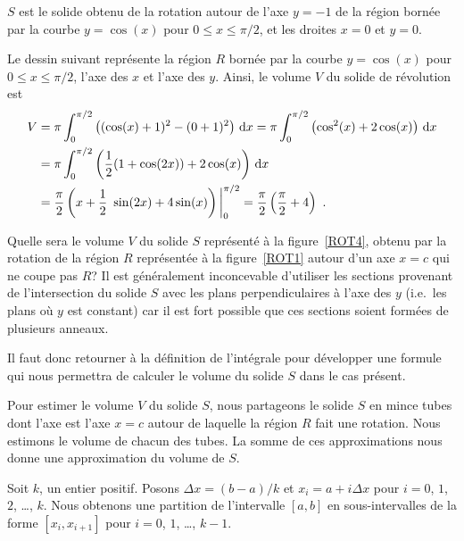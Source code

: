 {\begin{egg}
 $S$ est le solide obtenu de la rotation autour de l'axe $y=-1$ de la
région bornée par la courbe $y=\cos(x)$ pour $0\leq x\leq \pi/2$, et les
droites $x=0$ et $y=0$.

Le dessin suivant représente la région $R$ bornée par la courbe
$y=\cos(x)$ pour $0\leq x \leq \pi/2$, l'axe des $x$ et l'axe des $y$.
Ainsi, le volume $V$ du solide de révolution est
\begin{align*}
V &= \pi \int_0^{\pi/2} \left( (\cos(x) + 1)^2 - (0 +1)^2 \right) \,\mathrm{d}x
= \pi \int_0^{\pi/2} \left( \cos^2(x) + 2\cos(x) \right) \,\mathrm{d}x \\
& = \pi \int_0^{\pi/2} \left( \frac{1}{2} (1+\cos(2x)) + 2\cos(x)\right)
\,\mathrm{d}x \\
&= \frac{\pi}{2} \left( x + \frac{1}{2}\ \sin(2x) + 4\sin(x)
\right)\bigg|_0^{\pi/2} 
= \frac{\pi}{2}\left(\frac{\pi}{2} + 4\right) \ .
\end{align*}
\label{eggSR_washer}
\end{egg}

Quelle sera le volume $V$ du solide $S$ représenté à la
figure~\ref{ROT4}, obtenu par la rotation de la région $R$ représentée à
la figure~\ref{ROT1} autour d'un axe $x=c$ qui ne coupe pas $R$?  Il
est généralement inconcevable d'utiliser les sections provenant de
l'intersection du solide $S$ avec les plans perpendiculaires à l'axe
des $y$ (i.e.\ les plans où $y$ est constant) car il est fort possible
que ces sections soient formées de plusieurs anneaux.


Il faut donc retourner à la définition de l'intégrale pour développer une
formule qui nous permettra de calculer le volume du solide $S$ dans le cas
présent.

Pour estimer le volume $V$ du solide $S$, nous partageons le solide $S$ en mince
tubes dont l'axe est l'axe $x=c$ autour de laquelle la région $R$ fait une
rotation.  Nous estimons le volume de chacun des tubes.  La somme de ces
approximations nous donne une approximation du volume de $S$.

Soit $k$, un entier positif.  Posons $\Delta x = (b-a)/k$ et
$x_i = a + i \Delta x$ pour $i=0$, $1$, $2$, \ldots, $k$.  Nous obtenons une
partition de l'intervalle $[a,b]$ en sous-intervalles de la forme
$[x_i,x_{i+1}]$ pour $i=0$, $1$, \ldots, $k-1$.

}
